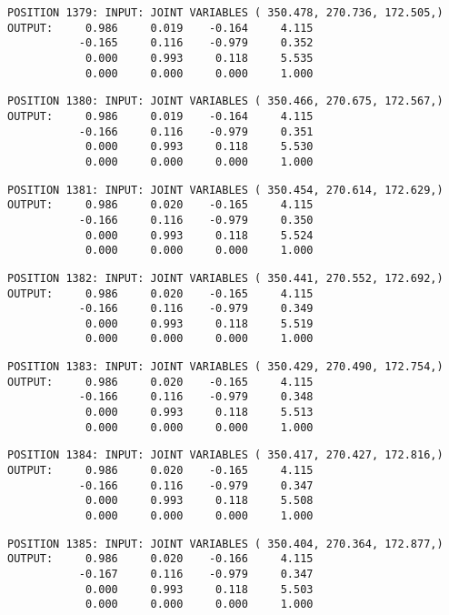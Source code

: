 \begin{verbatim}
POSITION 1379: INPUT: JOINT VARIABLES ( 350.478, 270.736, 172.505,)
OUTPUT:     0.986     0.019    -0.164     4.115
           -0.165     0.116    -0.979     0.352
            0.000     0.993     0.118     5.535
            0.000     0.000     0.000     1.000
\end{verbatim} \pagebreak[1]\begin{verbatim}
POSITION 1380: INPUT: JOINT VARIABLES ( 350.466, 270.675, 172.567,)
OUTPUT:     0.986     0.019    -0.164     4.115
           -0.166     0.116    -0.979     0.351
            0.000     0.993     0.118     5.530
            0.000     0.000     0.000     1.000
\end{verbatim} \pagebreak[1]\begin{verbatim}
POSITION 1381: INPUT: JOINT VARIABLES ( 350.454, 270.614, 172.629,)
OUTPUT:     0.986     0.020    -0.165     4.115
           -0.166     0.116    -0.979     0.350
            0.000     0.993     0.118     5.524
            0.000     0.000     0.000     1.000
\end{verbatim} \pagebreak[1]\begin{verbatim}
POSITION 1382: INPUT: JOINT VARIABLES ( 350.441, 270.552, 172.692,)
OUTPUT:     0.986     0.020    -0.165     4.115
           -0.166     0.116    -0.979     0.349
            0.000     0.993     0.118     5.519
            0.000     0.000     0.000     1.000
\end{verbatim} \pagebreak[1]\begin{verbatim}
POSITION 1383: INPUT: JOINT VARIABLES ( 350.429, 270.490, 172.754,)
OUTPUT:     0.986     0.020    -0.165     4.115
           -0.166     0.116    -0.979     0.348
            0.000     0.993     0.118     5.513
            0.000     0.000     0.000     1.000
\end{verbatim} \pagebreak[1]\begin{verbatim}
POSITION 1384: INPUT: JOINT VARIABLES ( 350.417, 270.427, 172.816,)
OUTPUT:     0.986     0.020    -0.165     4.115
           -0.166     0.116    -0.979     0.347
            0.000     0.993     0.118     5.508
            0.000     0.000     0.000     1.000
\end{verbatim} \pagebreak[1]\begin{verbatim}
POSITION 1385: INPUT: JOINT VARIABLES ( 350.404, 270.364, 172.877,)
OUTPUT:     0.986     0.020    -0.166     4.115
           -0.167     0.116    -0.979     0.347
            0.000     0.993     0.118     5.503
            0.000     0.000     0.000     1.000
\end{verbatim} \pagebreak[1]\begin{verbatim}

\end{verbatim}
